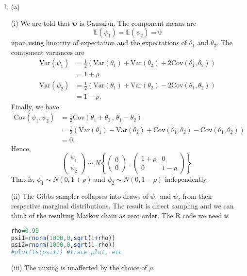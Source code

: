 \documentclass[12pt,BCOR2mm,DIV14,english]{scrreprt}
\theoremstyle{exmp}
\newcommand{\bmpsi}{\boldsymbol{\psi}}
\newcommand{\E}{\mathbb{E}}
\newcommand{\V}{\mathrm{Var}}
\begin{document}
\begin{enumerate}
\item 

(a) 

(i) We are told that $\bmpsi$ is Gaussian. The component means are
\[
\E(\psi_1)=\E(\psi_2)=0
\]
upon using linearity of expectation and the expectations of $\theta_1$ and $\theta_2$. 
The component variances are
\begin{align*}
\V(\psi_1)&=\frac{1}{2}(\V(\theta_1) +\V(\theta_2)+2\textrm{Cov}(\theta_1,\theta_2))\\
&=1+\rho.
\end{align*}
\begin{align*}
\V(\psi_2)&=\frac{1}{2}(\V(\theta_1) +\V(\theta_2)-2\textrm{Cov}(\theta_1,\theta_2))\\
&=1-\rho.
\end{align*}
Finally, we have
\begin{align*}
\textrm{Cov}(\psi_1,\psi_2)&=\frac{1}{2}\textrm{Cov}(\theta_1+\theta_2\,,\,\theta_1-\theta_2)\\
&= \frac{1}{2}(\V(\theta_1)-\V(\theta_2)+\textrm{Cov}(\theta_1,\theta_2)-\textrm{Cov}(\theta_1,\theta_2))\\
&=0.
\end{align*}
Hence,
\[
\begin{pmatrix} \psi_1 \\ \psi_2 \end{pmatrix} \sim 
N\left\{\begin{pmatrix} 0 \\ 0 \end{pmatrix}\,,\, \begin{pmatrix} 1+\rho & 0\\ 0 & 1-\rho \end{pmatrix}   \right\}.
\]
That is, $\psi_1 \sim N(0,1+\rho)$ and $\psi_2\sim N(0,1-\rho)$ independently. 

(ii) The Gibbs sampler collapses into draws of $\psi_1$ and $\psi_2$ from 
their respective marginal distributions. The result is direct sampling and we can think of the 
resulting Markov chain as zero order. The R code we need is

\begin{lstlisting}[language=R]
rho=0.99
psi1=rnorm(1000,0,sqrt(1+rho))
psi2=rnorm(1000,0,sqrt(1-rho))
#plot(ts(psi1)) #trace plot, etc
\end{lstlisting}

(iii) The mixing is unaffected by the choice of $\rho$.


\end{enumerate}
\end{document}
